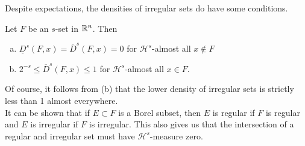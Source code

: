 \documentclass{memoir}
\begin{document}
Despite expectations, the densities of irregular sets do have some conditions.
\begin{prop}
	Let \(F\) be an \(s\)-set in \(\mathbb{R}^{n}\). Then
	\begin{enumerate}[(a).]
		\item \(\underline{D}^{s}(F,x) = \overline{D}^{s}(F,x) = 0\) for \(\mathcal{H}^{s}\)-almost all \(x \not\in F\) 
		\item \(2^{-s}\leq \overline{D}^{s}(F,x)\leq 1\) for \(\mathcal{H}^{s}\)-almost all \(x \in F\).
	\end{enumerate}
\end{prop}
Of course, it follows from (b) that the lower density of irregular sets is strictly less than 1 almost everywhere.\\

It can be shown that if \(E\subset F\) is a Borel subset, then \(E\) is regular if \(F\) is regular and \(E\) is irregular if \(F\) is irregular. This also gives us that the intersection of a regular and irregular set must have \(\mathcal{H}^{s}\)-measure zero.
\end{document}
